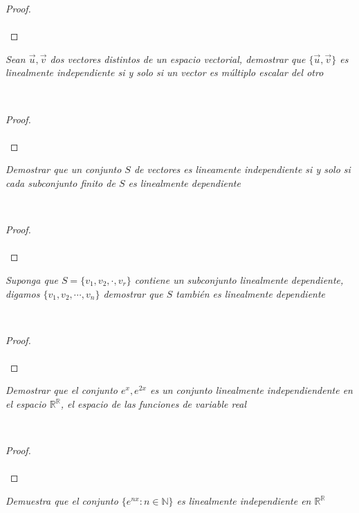 \documentclass[11pt,letterpaper]{article}
\newcommand{\R}{\mathbb{R}}
\newcommand{\N}{\mathbb{N}}
\begin{document}
\begin{proof}\,\\
    \,\\
\end{proof}
\begin{tcolorbox}[
	title = \textcolor{black}{\textcolor{white}{Problema 9}},]
\textit{Sean $\vec{u},\vec{v}$ dos vectores distintos de un espacio vectorial, demostrar que $\{\vec{u},\vec{v}\}$
es linealmente independiente si y solo si un vector es m\'ultiplo escalar del otro
}
\end{tcolorbox}\,\\
\begin{proof}\,\\
    \,\\
\end{proof}
\begin{tcolorbox}[
	title = \textcolor{black}{\textcolor{white}{Problema 10}},]
\textit{Demostrar que un conjunto $S$ de vectores es lineamente independiente si y solo si cada subconjunto finito de $S$ es linealmente dependiente 
}
\end{tcolorbox}\,\\
\begin{proof}\,\\
    \,\\
\end{proof}
\begin{tcolorbox}[
	title = \textcolor{black}{\textcolor{white}{Problema 11}},]
\textit{Suponga que $S=\{v_1,v_2,\cdot,v_r\}$ contiene un subconjunto linealmente dependiente, digamos $\{v_1,v_2,\cdots,v_n\}$
demostrar que $S$ tambi\'en es linealmente dependiente
}
\end{tcolorbox}\,\\
\begin{proof}\,\\
    \,\\
\end{proof}
\begin{tcolorbox}[
	title = \textcolor{black}{\textcolor{white}{Problema 12}},]
\textit{Demostrar que el conjunto $e^x,e^{2x}$ es un conjunto linealmente independiendente en el espacio $\R^{\R}$, el espacio de 
las funciones de variable real
}
\end{tcolorbox}\,\\
\begin{proof}\,\\
    \,\\
\end{proof}
\begin{tcolorbox}[
	title = \textcolor{black}{\textcolor{white}{Problema 13}},]
\textit{Demuestra que el conjunto $\{e^{nx}:n\in \N\}$ es linealmente independiente en $\R^\R$
}
\end{tcolorbox}\,\\
\end{document}
